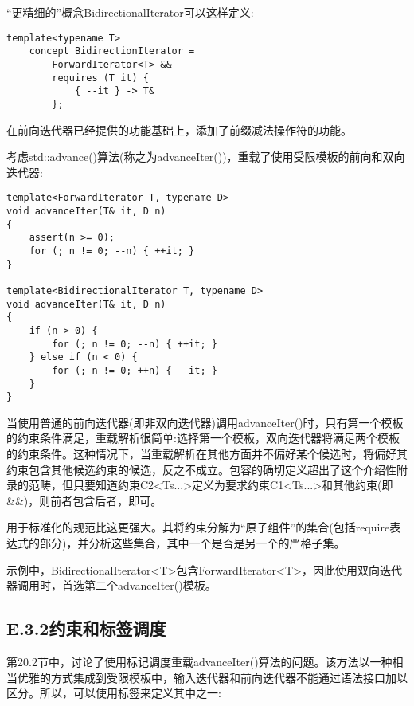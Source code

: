 “更精细的”概念BidirectionalIterator可以这样定义:

\begin{lstlisting}[style=styleCXX]
template<typename T>
	concept BidirectionIterator =
		ForwardIterator<T> &&
		requires (T it) {
			{ --it } -> T&
		};
\end{lstlisting}

在前向迭代器已经提供的功能基础上，添加了前缀减法操作符的功能。

考虑std::advance()算法(称之为advanceIter())，重载了使用受限模板的前向和双向迭代器:

\begin{lstlisting}[style=styleCXX]
template<ForwardIterator T, typename D>
void advanceIter(T& it, D n)
{
	assert(n >= 0);
	for (; n != 0; --n) { ++it; }
}

template<BidirectionalIterator T, typename D>
void advanceIter(T& it, D n)
{
	if (n > 0) {
		for (; n != 0; --n) { ++it; }
	} else if (n < 0) {
		for (; n != 0; ++n) { --it; }
	}
}
\end{lstlisting}

当使用普通的前向迭代器(即非双向迭代器)调用advanceIter()时，只有第一个模板的约束条件满足，重载解析很简单:选择第一个模板，双向迭代器将满足两个模板的约束条件。这种情况下，当重载解析在其他方面并不偏好某个候选时，将偏好其约束包含其他候选约束的候选，反之不成立。包容的确切定义超出了这个介绍性附录的范畴，但只要知道约束C2<Ts...>定义为要求约束C1<Ts...>和其他约束(即\&\&)，则前者包含后者，即可。

\begin{tcolorbox}[colback=webgreen!5!white,colframe=webgreen!75!black]
\hspace*{0.75cm}用于标准化的规范比这更强大。其将约束分解为“原子组件”的集合(包括require表达式的部分)，并分析这些集合，其中一个是否是另一个的严格子集。
\end{tcolorbox}

示例中，BidirectionalIterator<T>包含ForwardIterator<T>，因此使用双向迭代器调用时，首选第二个advanceIter()模板。

\subsection{E.3.2\hspace{0.2cm}约束和标签调度}

第20.2节中，讨论了使用标记调度重载advanceIter()算法的问题。该方法以一种相当优雅的方式集成到受限模板中，输入迭代器和前向迭代器不能通过语法接口加以区分。所以，可以使用标签来定义其中之一:

